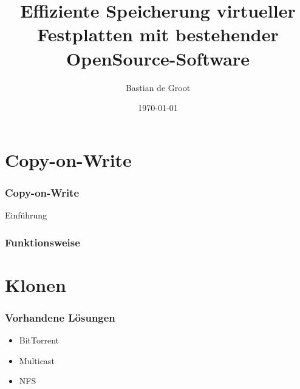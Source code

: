 \documentclass{beamer}
\begin{document}
\title{Effiziente Speicherung virtueller Festplatten mit bestehender OpenSource-Software}  
\author{Bastian de Groot}
\date{\today} 


\begin{frame}
\titlepage
\end{frame} 

\section{Copy-on-Write}
\begin{frame}
\frametitle{Copy-on-Write} 
Einführung
\end{frame}

\begin{frame}
\frametitle{Funktionsweise} 

\end{frame}

\section{Klonen}

\begin{frame}
\frametitle{Vorhandene Lösungen} 
\begin{itemize}

 \item BitTorrent
 \item Multicast
 \item NFS
 
\end{itemize}
\end{frame}
\end{document}
